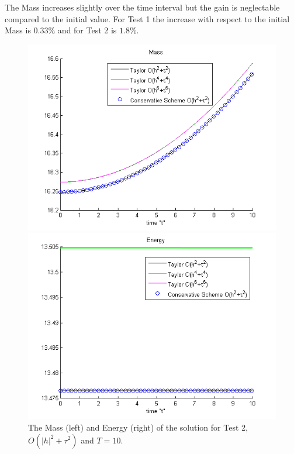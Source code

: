 \documentclass[%
 aip,
cp,  %
 amsmath,amssymb,%
 reprint,%
]{revtex4-2}
\begin{document}
The Mass increases slightly over the time interval but the gain is neglectable compared to the initial value. For Test 1 the increase with respect to the initial Mass is $0.33\%$ and for Test 2 is $1.8\%$.

\begin{figure}[ht]\vspace{0.2cm}
	\begin{minipage}[b]{0.4\linewidth}
		 \includegraphics[width=\linewidth]{figures/Mass_bt1_c090_h010_Taylor_Conservative.png}
	\end{minipage}	
	\begin{minipage}[b]{0.4\linewidth}
		\includegraphics[width=\linewidth]{figures/Energy_bt1_c090_h010_Taylor_Conservative.png}
		
	\end{minipage}
\caption{The Mass (left) and Energy (right) of the solution for Test 2, $O(|h|^2 + \tau^2)$ and $T = 10$.}
\label{Test2En}
\end{figure}
\end{document}

